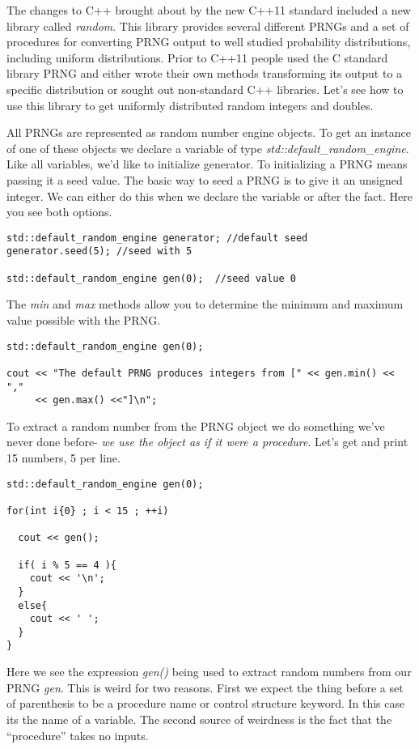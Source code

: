 \documentclass[]{tufte-handout}
\begin{document}
The changes to C++ brought about by the new C++11 standard included a new library called \textit{random}. This library provides several different PRNGs and a set of procedures for converting PRNG output to well studied probability distributions, including uniform distributions. Prior to C++11 people used the C standard library PRNG and either wrote their own methods transforming its output to a specific distribution or sought out non-standard C++ libraries. Let's see how to use this library to get uniformly distributed random integers and doubles.

All PRNGs are represented as random number engine objects. To get an instance of one of these objects we declare a variable of type \textit{std::default\_random\_engine}. Like all variables, we'd like to initialize generator. To initializing a PRNG means passing it a seed value. The basic way to seed a PRNG is to give it an unsigned integer. We can either do this when we declare the variable or after the fact.  Here you see both options.

\begin{verbatim}
std::default_random_engine generator; //default seed
generator.seed(5); //seed with 5

std::default_random_engine gen(0);  //seed value 0
\end{verbatim}

The \textit{min} and \textit{max} methods allow you to determine the minimum and maximum value possible with the PRNG\@.
\begin{verbatim}
std::default_random_engine gen(0);

cout << "The default PRNG produces integers from [" << gen.min() << ","
     << gen.max() <<"]\n";
\end{verbatim}

To extract a random number from the PRNG object we do something we've never done before- \textit{we use the object as if it were a procedure}. Let's get and print 15 numbers, 5 per line.
\begin{verbatim}
std::default_random_engine gen(0);

for(int i{0} ; i < 15 ; ++i)

  cout << gen();

  if( i % 5 == 4 ){
    cout << '\n';
  }
  else{
    cout << ' ';
  }
}
\end{verbatim}
Here we see the expression \textit{gen()} being used to extract random numbers from our PRNG \textit{gen}. This is weird for two reasons. First we expect the thing before a set of parenthesis to be a procedure name or control structure keyword. In this case its the name of a variable. The second source of weirdness is the fact that the ``procedure'' takes no inputs.
\end{document}
